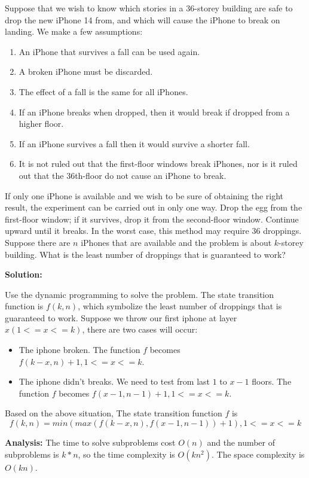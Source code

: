 \problem{}
Suppose that we wish to know which stories in a 36-storey building are safe to drop the new iPhone 14 from, and which will cause the iPhone to break on landing. We make a few assumptions:
\begin{enumerate}
    \item An iPhone that survives a fall can be used again. 
    \item A broken iPhone must be discarded. 
    \item The effect of a fall is the same for all iPhones. 
    \item If an iPhone breaks when dropped, then it would break if dropped from a higher floor. 
    \item If an iPhone survives a fall then it would survive a shorter fall. 
    \item It is not ruled out that the first-floor windows break iPhones, nor is it ruled out that the 36th-floor do not cause an iPhone to break.
\end{enumerate}
If only one iPhone is available and we wish to be sure of obtaining the right result, the experiment can be carried out in only one way. Drop the egg from the first-floor window; if it survives, drop it from the second-floor window. Continue upward until it breaks. In the worst case, this method may require 36 droppings. Suppose there are $n$ iPhones that are available and the problem is about $k$-storey building. What is the least number of droppings that is guaranteed to work? 

\textbf{Solution:}

Use the dynamic programming to solve the problem. The state transition function is $f(k,n)$, which symbolize the least number of droppings that is guaranteed to work. Suppose we throw our first iphone at layer $x(1<=x<=k)$, there are two cases will occur:

\begin{itemize}
	\item The iphone broken. The function $f$ becomes $f(k-x, n)+1, 1<=x<=k$.
	\item The iphone didn't breaks. We need to test from last $1$ to $x-1$ floors. The function $f$ becomes $f(x-1, n-1)+1, 1<=x<=k$.
\end{itemize}

Based on the above situation, The state transition function $f$ is
$$f(k,n) = min(max(f(k-x, n),f(x-1, n-1))+1), 1<=x<=k$$

\textbf{Analysis:}
The time to solve subproblems cost $O(n)$ and the number of subproblems is $k*n$, so the time complexity is $O(kn^2)$. The space complexity is $O(kn)$. 
